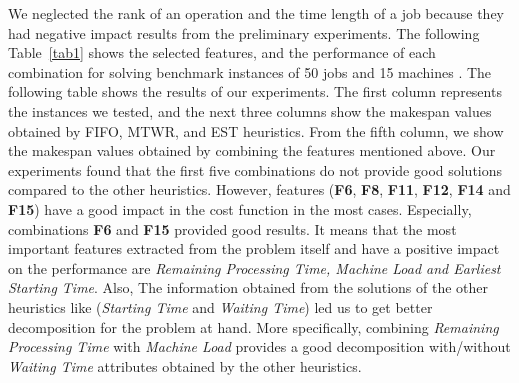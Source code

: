 \documentclass[runningheads]{llncs}
\begin{document}
We neglected the rank of an operation and the time length of a job because they had negative impact results from the preliminary experiments. The following Table~\ref{tab1} shows the selected features, and the performance of each combination for solving benchmark instances of 50 jobs and 15 machines \cite{taillard1993benchmarks}. The following table shows the results of our experiments. The first column represents the instances we tested, and the next three columns show the makespan values obtained by FIFO, MTWR, and EST heuristics. From the fifth column, we show the makespan values obtained by combining the features mentioned above. Our experiments found that the first five combinations do not provide good solutions compared to the other heuristics. However, features (\textbf{F6}, \textbf{F8}, \textbf{F11}, \textbf{F12}, \textbf{F14} and \textbf{F15}) have a good impact in the cost function in the most cases. Especially, combinations \textbf{F6} and \textbf{F15} provided good results. It means that the most important features extracted from the problem itself and have a positive impact on the performance are \textit{Remaining Processing Time, Machine Load and Earliest Starting Time}. Also, The information obtained from the solutions of the other heuristics like (\textit{Starting Time} and \textit{Waiting Time}) led us to get better decomposition for the problem at hand. More specifically, combining \textit{Remaining Processing Time} with \textit{Machine Load} provides a good decomposition with/without \textit{Waiting Time} attributes obtained by the other heuristics.
\end{document}
